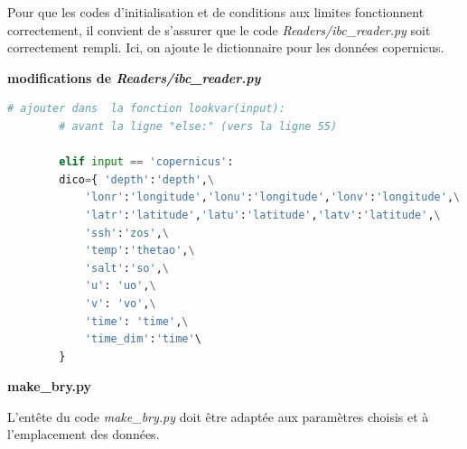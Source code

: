 \documentclass[10pt,a4paper,titlepage]{article}
\begin{document}
Pour que les codes d'initialisation et de conditions aux limites fonctionnent correctement, il convient de s'assurer que le code \textit{Readers/ibc\_reader.py} soit correctement rempli.  Ici, on ajoute le dictionnaire pour les données copernicus.

\begin{codeEnv}{\textbf{modifications de \textit{Readers/ibc\_reader.py}}}
    \begin{lstlisting}[language=python]
        # ajouter dans  la fonction lookvar(input):
        # avant la ligne "else:" (vers la ligne 55)

        elif input == 'copernicus':
        dico={ 'depth':'depth',\
            'lonr':'longitude','lonu':'longitude','lonv':'longitude',\
            'latr':'latitude','latu':'latitude','latv':'latitude',\
            'ssh':'zos',\
            'temp':'thetao',\
            'salt':'so',\
            'u': 'uo',\
            'v': 'vo',\
            'time': 'time',\
            'time_dim':'time'\
        }
    \end{lstlisting}
\end{codeEnv}

\textbf{make\_bry.py}

L'entête du code \textit{make\_bry.py} doit être adaptée aux paramètres choisis et à l'emplacement des données.
\end{document}
